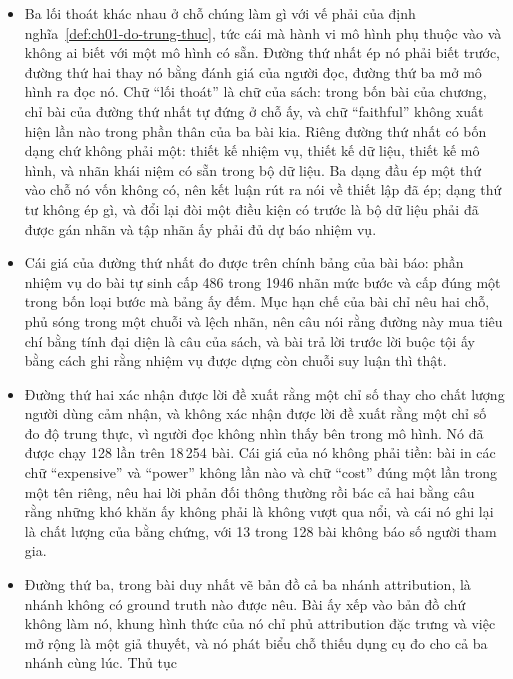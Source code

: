 \begin{tomtat}
\begin{itemize}
  \item Ba lối thoát khác nhau ở chỗ chúng làm gì với vế phải của
định nghĩa~\ref{def:ch01-do-trung-thuc}, tức cái mà hành vi mô hình phụ thuộc
vào và không ai biết với một mô hình có sẵn. Đường thứ nhất ép nó phải biết
trước, đường thứ hai thay nó bằng đánh giá của người đọc, đường thứ ba mở mô
hình ra đọc nó. Chữ \enquote{lối thoát} là chữ của sách: trong bốn bài của
chương, chỉ bài của đường thứ nhất tự đứng ở chỗ ấy, và chữ \enquote{faithful}
không xuất hiện lần nào trong phần thân của ba bài kia. Riêng đường thứ nhất có
bốn dạng chứ không phải một: thiết kế nhiệm vụ, thiết kế dữ liệu, thiết kế mô
hình, và nhãn khái niệm có sẵn trong bộ dữ liệu. Ba dạng đầu ép một thứ vào chỗ
nó vốn không có, nên kết luận rút ra nói về thiết lập đã ép; dạng thứ tư không ép
gì, và đổi lại đòi một điều kiện có trước là bộ dữ liệu phải đã được gán nhãn và
tập nhãn ấy phải đủ dự báo nhiệm vụ.
  \item Cái giá của đường thứ nhất đo được trên chính bảng của bài báo: phần
nhiệm vụ do bài tự sinh cấp 486 trong 1946 nhãn mức bước và cấp đúng một trong
bốn loại bước mà bảng ấy đếm. Mục hạn chế của bài chỉ nêu hai chỗ, phủ sóng
trong một chuỗi và lệch nhãn, nên câu nói rằng đường này mua tiêu chí bằng tính
đại diện là câu
của sách, và bài trả lời trước lời buộc tội ấy bằng cách ghi rằng nhiệm vụ được
dựng còn chuỗi suy luận thì thật.
  \item Đường thứ hai xác nhận được lời đề xuất rằng một chỉ số thay cho chất
lượng người dùng cảm nhận, và không xác nhận được lời đề xuất rằng một chỉ số đo
độ trung thực, vì người đọc không nhìn thấy bên trong mô hình. Nó đã được chạy
128 lần trên 18\,254 bài. Cái giá của nó không phải tiền: bài in các chữ
\enquote{expensive} và \enquote{power} không lần nào và chữ \enquote{cost} đúng
một lần trong một tên riêng, nêu hai lời phản đối thông thường rồi bác cả hai
bằng câu rằng những khó khăn ấy không phải là không vượt qua nổi, và cái nó ghi lại là chất lượng của bằng
chứng, với 13 trong 128 bài không báo số người tham gia.
  \item Đường thứ ba, trong bài duy nhất vẽ bản đồ cả ba nhánh attribution, là
nhánh không có ground truth nào được nêu. Bài ấy xếp
 vào bản đồ chứ không làm nó,
khung hình thức của nó chỉ phủ attribution đặc trưng và việc mở rộng là một giả
thuyết, và nó phát biểu chỗ thiếu dụng cụ đo cho cả ba nhánh cùng lúc. Thủ tục

\end{itemize}
\end{tomtat}
